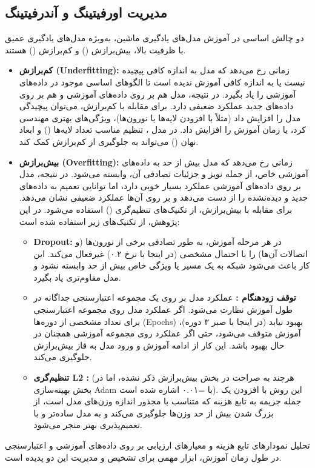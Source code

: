 \subsection{مدیریت اورفیتینگ و آندرفیتینگ}
دو چالش اساسی در آموزش مدل‌های یادگیری ماشین، به‌ویژه مدل‌های یادگیری عمیق با ظرفیت بالا، بیش‌برازش () و کم‌برازش () هستند.

\begin{itemize}
    \item \textbf{کم‌برازش (Underfitting):} زمانی رخ می‌دهد که مدل به اندازه کافی پیچیده نیست یا به اندازه کافی آموزش ندیده است تا الگوهای اساسی موجود در داده‌های آموزشی را یاد بگیرد. در نتیجه، مدل هم بر روی داده‌های آموزشی و هم بر روی داده‌های جدید عملکرد ضعیفی دارد. برای مقابله با کم‌برازش، می‌توان پیچیدگی مدل را افزایش داد (مثلاً با افزودن لایه‌ها یا نورون‌ها)، ویژگی‌های بهتری مهندسی کرد، یا زمان آموزش را افزایش داد. در مدل ، تنظیم مناسب تعداد لایه‌ها () و ابعاد نهان () می‌تواند به جلوگیری از کم‌برازش کمک کند.
    \item \textbf{بیش‌برازش (Overfitting):} زمانی رخ می‌دهد که مدل بیش از حد به داده‌های آموزشی خاص، از جمله نویز و جزئیات تصادفی آن، وابسته می‌شود. در نتیجه، مدل بر روی داده‌های آموزشی عملکرد بسیار خوبی دارد، اما توانایی تعمیم به داده‌های جدید و دیده‌نشده را از دست می‌دهد و بر روی آن‌ها عملکرد ضعیفی نشان می‌دهد. برای مقابله با بیش‌برازش، از تکنیک‌های تنظیم‌گری () استفاده می‌شود. در این پژوهش، از تکنیک‌های زیر استفاده شده است:
    \begin{itemize}
        \item \textbf{Dropout:} در هر مرحله آموزش، به طور تصادفی برخی از نورون‌ها (و اتصالات آن‌ها) را با احتمال مشخصی (در اینجا با نرخ ۰.۲) غیرفعال می‌کند. این کار باعث می‌شود شبکه به یک مسیر یا ویژگی خاص بیش از حد وابسته نشود و مدل مقاوم‌تری یاد بگیرد.
        \item \textbf{توقف زودهنگام :} عملکرد مدل بر روی یک مجموعه اعتبارسنجی جداگانه در طول آموزش نظارت می‌شود. اگر عملکرد مدل روی مجموعه اعتبارسنجی برای تعداد مشخصی از دوره‌ها (Epochs) بهبود نیابد (در اینجا با صبر ۳ دوره)، آموزش متوقف می‌شود، حتی اگر عملکرد روی مجموعه آموزشی همچنان در حال بهبود باشد. این کار از ادامه آموزش و ورود مدل به فاز بیش‌برازش جلوگیری می‌کند.
        \item \textbf{تنظیم‌گری L2 :} (هرچند به صراحت در بخش بیش‌برازش ذکر نشده، اما در بخش بهینه‌سازی Adam با =۰.۰۱ اشاره شده است). این روش با افزودن یک جمله جریمه به تابع هزینه که متناسب با مجذور اندازه وزن‌های مدل است، از بزرگ شدن بیش از حد وزن‌ها جلوگیری می‌کند و به مدل ساده‌تر و با تعمیم‌پذیری بهتر منجر می‌شود.
    \end{itemize}
\end{itemize}
تحلیل نمودارهای تابع هزینه و معیارهای ارزیابی بر روی داده‌های آموزشی و اعتبارسنجی در طول زمان آموزش، ابزار مهمی برای تشخیص و مدیریت این دو پدیده است.

